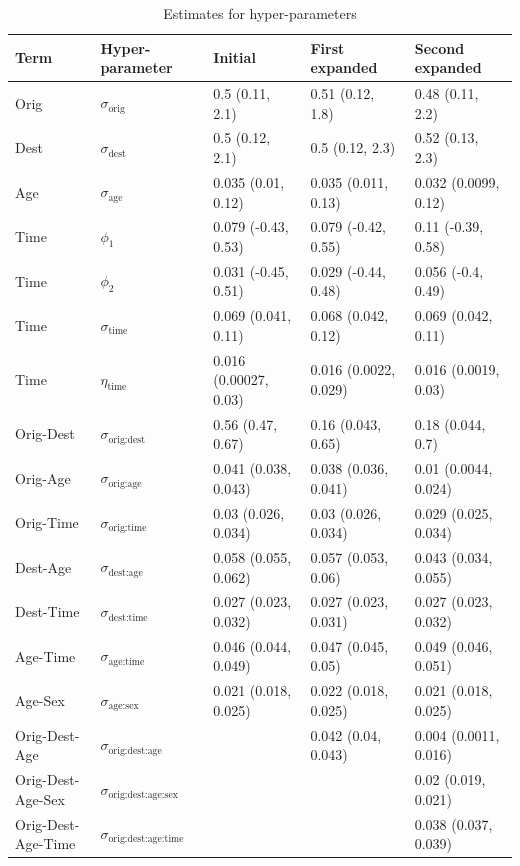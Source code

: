 \begin{table}[ht]
\centering
\caption{Estimates for hyper-parameters} 
\label{tab:hyper}
\begingroup\small
\begin{tabular}{p{2.9cm}p{2cm}p{3.2cm}p{3.2cm}p{3.2cm}}
  \hline
Term & Hyper-parameter & Initial & First expanded & Second expanded \\ 
  \hline
Orig & $\sigma_{\text{orig}}$ & 0.5 (0.11, 2.1) & 0.51 (0.12, 1.8) & 0.48 (0.11, 2.2) \\ 
  Dest & $\sigma_{\text{dest}}$ & 0.5 (0.12, 2.1) & 0.5 (0.12, 2.3) & 0.52 (0.13, 2.3) \\ 
  Age & $\sigma_{\text{age}}$ & 0.035 (0.01, 0.12) & 0.035 (0.011, 0.13) & 0.032 (0.0099, 0.12) \\ 
  Time & $\phi_1$ & 0.079 (-0.43, 0.53) & 0.079 (-0.42, 0.55) & 0.11 (-0.39, 0.58) \\ 
  Time & $\phi_2$ & 0.031 (-0.45, 0.51) & 0.029 (-0.44, 0.48) & 0.056 (-0.4, 0.49) \\ 
  Time & $\sigma_{\text{time}}$ & 0.069 (0.041, 0.11) & 0.068 (0.042, 0.12) & 0.069 (0.042, 0.11) \\ 
  Time & $\eta_{\text{time}}$ & 0.016 (0.00027, 0.03) & 0.016 (0.0022, 0.029) & 0.016 (0.0019, 0.03) \\ 
  Orig-Dest & $\sigma_{\text{orig:dest}}$ & 0.56 (0.47, 0.67) & 0.16 (0.043, 0.65) & 0.18 (0.044, 0.7) \\ 
  Orig-Age & $\sigma_{\text{orig:age}}$ & 0.041 (0.038, 0.043) & 0.038 (0.036, 0.041) & 0.01 (0.0044, 0.024) \\ 
  Orig-Time & $\sigma_{\text{orig:time}}$ & 0.03 (0.026, 0.034) & 0.03 (0.026, 0.034) & 0.029 (0.025, 0.034) \\ 
  Dest-Age & $\sigma_{\text{dest:age}}$ & 0.058 (0.055, 0.062) & 0.057 (0.053, 0.06) & 0.043 (0.034, 0.055) \\ 
  Dest-Time & $\sigma_{\text{dest:time}}$ & 0.027 (0.023, 0.032) & 0.027 (0.023, 0.031) & 0.027 (0.023, 0.032) \\ 
  Age-Time & $\sigma_{\text{age:time}}$ & 0.046 (0.044, 0.049) & 0.047 (0.045, 0.05) & 0.049 (0.046, 0.051) \\ 
  Age-Sex & $\sigma_{\text{age:sex}}$ & 0.021 (0.018, 0.025) & 0.022 (0.018, 0.025) & 0.021 (0.018, 0.025) \\ 
  Orig-Dest-Age & $\sigma_{\text{orig:dest:age}}$ &  & 0.042 (0.04, 0.043) & 0.004 (0.0011, 0.016) \\ 
  Orig-Dest-Age-Sex & $\sigma_{\text{orig:dest:age:sex}}$ &  &  & 0.02 (0.019, 0.021) \\ 
  Orig-Dest-Age-Time & $\sigma_{\text{orig:dest:age:time}}$ &  &  & 0.038 (0.037, 0.039) \\ 
   \hline
\end{tabular}
\endgroup
\end{table}
